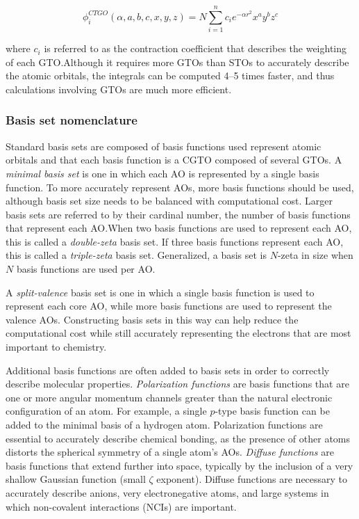 \begin{equation}
\phi_i^{CTGO}(\alpha,a,b,c,x,y,z) = N \sum_{i=1}^n c_i e^{-\alpha r^2} x^a y^b z^c
\end{equation}

\noindent where $c_i$ is referred to as the contraction coefficient that
describes the weighting of each GTO.\@ Although it requires more GTOs than STOs
to accurately describe the atomic orbitals, the integrals can be computed 4--5
times faster, and thus calculations involving GTOs are much more
efficient.\cite{Gill1994}

\subsubsection{Basis set nomenclature}

Standard basis sets are composed of basis functions used represent atomic
orbitals and that each basis function is a CGTO composed of several GTOs. A
\emph{minimal basis set} is one in which each AO is represented by a single
basis function. To more accurately represent AOs, more basis functions should
be used, although basis set size needs to be balanced with computational cost.
Larger basis sets are referred to by their cardinal number, the number of basis
functions that represent each AO.\@ When two basis functions are used to
represent each AO, this is called a \emph{double-zeta} basis set. If three
basis functions represent each AO, this is called a \emph{triple-zeta} basis
set. Generalized, a basis set is $N$-zeta in size when $N$ basis functions are
used per AO.\@

A \emph{split-valence} basis set is one in which a single basis function is
used to represent each core AO, while more basis functions are used to
represent the valence AOs. Constructing basis sets in this way can help reduce
the computational cost while still accurately representing the electrons that
are most important to chemistry.

Additional basis functions are often added to basis sets in order to correctly
describe molecular properties. \emph{Polarization functions} are basis
functions that are one or more angular momentum channels greater than the
natural electronic configuration of an atom. For example, a single $p$-type
basis function can be added to the minimal basis of a hydrogen atom.
Polarization functions are essential to accurately describe chemical bonding,
as the presence of other atoms distorts the spherical symmetry of a single
atom's AOs.\cite{Szabo1996} \emph{Diffuse functions} are basis functions that
extend further into space, typically by the inclusion of a very shallow
Gaussian function (small $\zeta$ exponent). Diffuse functions are necessary to
accurately describe anions, very electronegative atoms, and large systems in
which non-covalent interactions (NCIs) are important.

